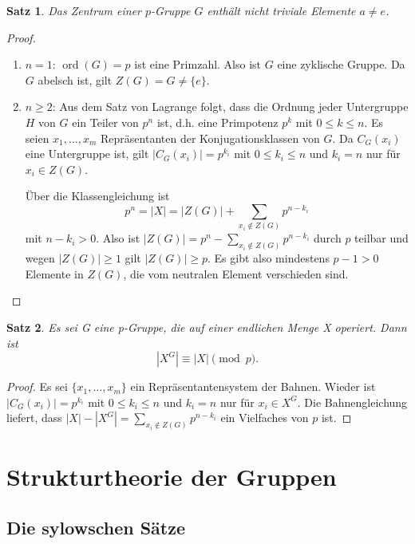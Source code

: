 \documentclass[12pt]{scrartcl} %
\DeclareMathOperator{\ord}{ord}
\newtheorem{thm}{Satz}
\theoremstyle{definition}
\theoremstyle{remark}
\begin{document}
\begin{thm}
	Das Zentrum einer \(p\)-Gruppe \(G\) enthält nicht triviale Elemente $a \neq e$.
\end{thm}

\begin{proof}
	\begin{enumerate}
	\item \(n=1\): \(\ord(G)=p\) ist eine Primzahl.
		Also ist \(G\) eine zyklische Gruppe.
		Da \(G\) abelsch ist, gilt \(Z(G) = G \neq \{e\}\).
	\item \(n\geq 2\): Aus dem Satz von Lagrange folgt, dass die Ordnung jeder Untergruppe $H$ von $G$ ein Teiler von $p^n$ ist, d.h. eine Primpotenz $p^k$ mit $0\leq k\leq n$.
		Es seien $x_{1}, \dots ,x_{m}$ Repräsentanten der Konjugationsklassen von $G$.
		Da $C_{G}(x_{i})$ eine Untergruppe ist, gilt \(|C_{G}(x_{i})|=p^{k_i}\) mit $0\leq k_{i} \leq n$ und $k_{i}=n$ nur für $x_i \in Z(G)$.

		Über die Klassengleichung ist \[p^n=|X|=|Z(G)|+\sum_{x_{i}\notin Z(G)}p^{n-k_{i}}\] mit $n-k_{i}>0$.
		Also ist $|Z(G)|= p^n-\sum_{x_{i}\notin Z(G)}p^{n-k_{i}}$ durch \(p\) teilbar und wegen $|Z(G)|\geq 1$ gilt $|Z(G)|\geq p$.
		Es gibt also mindestens $p-1 > 0$ Elemente in $Z(G)$, die vom neutralen Element verschieden sind.\qedhere
\end{enumerate}
\end{proof}

\begin{thm}
	Es sei G eine p-Gruppe, die auf einer endlichen Menge X operiert. Dann ist
	\begin{equation*}
		|X^G|\equiv |X| \pmod{p}.
	\end{equation*}
\end{thm}

\begin{proof}
	Es sei $\{x_{1}, \dots ,x_{m}\}$ ein Repräsentantensystem der Bahnen.
	Wieder ist $|C_{G}(x_{i})|=p^{k_i}$ mit $0\leq k_{i} \leq n$ und $k_{i}=n$ nur für $x_{i} \in X^G$.
	Die Bahnengleichung liefert, dass $|X|-|X^G|=\sum_{x_{i}\notin Z(G)}p^{n-k_{i}}$ ein Vielfaches von \(p\) ist.
\end{proof}

\section{Strukturtheorie der Gruppen}

\subsection{Die sylowschen Sätze}
\end{document}
